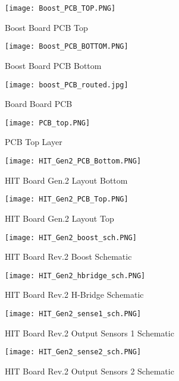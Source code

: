 \begin{figure}[h]
\centering
\texttt{[image: Boost\_PCB\_TOP.PNG]}
\caption{Boost Board PCB Top}
\label{boostPCBTop}
\end{figure}

\begin{figure}[h]
\centering
\texttt{[image: Boost\_PCB\_BOTTOM.PNG]}
\caption{Boost Board PCB Bottom}
\label{boostPCBBottom}
\end{figure}

\begin{figure}[h]
\centering
\texttt{[image: boost\_PCB\_routed.jpg]}
\caption{Board Board PCB}
\label{unpopulatedBoostPCB}
\end{figure}

\begin{figure}[h]
\centering
\texttt{[image: PCB\_top.PNG]}
\caption{PCB Top Layer}
\label{PCB top}
\end{figure}

\begin{figure}[h]
\centering
\texttt{[image: HIT\_Gen2\_PCB\_Bottom.PNG]}
\caption{HIT Board Gen.2 Layout Bottom}
\label{HIT Board Gen2 Bottom}
\end{figure}

\begin{figure}[h]
\centering
\texttt{[image: HIT\_Gen2\_PCB\_Top.PNG]}
\caption{HIT Board Gen.2 Layout Top}
\label{HIT Board Gen2 Top}
\end{figure}

\begin{figure}[h]
\centering
\texttt{[image: HIT\_Gen2\_boost\_sch.PNG]}
\caption{HIT Board Rev.2 Boost Schematic}
\label{Rev2 boost sch}
\end{figure}


\begin{figure}[h]
\centering
\texttt{[image: HIT\_Gen2\_hbridge\_sch.PNG]}
\caption{HIT Board Rev.2 H-Bridge Schematic}
\label{Rev2 hbridge sch}
\end{figure}

\begin{figure}[h]
\centering
\texttt{[image: HIT\_Gen2\_sense1\_sch.PNG]}
\caption{HIT Board Rev.2 Output Sensors 1 Schematic}
\label{Rev2 sense1 sch}
\end{figure}

\clearpage
\begin{figure}[h]
\centering
\texttt{[image: HIT\_Gen2\_sense2\_sch.PNG]}
\caption{HIT Board Rev.2 Output Sensors 2 Schematic}
\label{Rev2 sense2 sch}
\end{figure}


